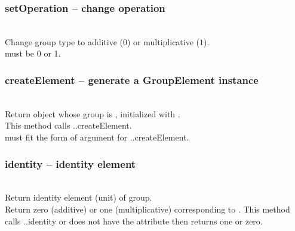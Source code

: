   \subsubsection{setOperation -- change operation}
   \\
   \spacing
   \quad Change group type to additive ($0$) or multiplicative ($1$).\\
   \spacing
   \quad {} must be 0 or 1.\\
 \subsubsection{\negok createElement -- generate a GroupElement instance}
   \\
   \spacing
   \quad Return  object whose group is , initialized with .\\
   \spacing
   \quad \negok This method calls ..createElement.\\
   \spacing
   \quad {} must fit the form of argument for ..createElement.\\
  \subsubsection{\negok identity -- identity element}
   \\
   \spacing
   \quad Return identity element (unit) of group.\\
   \spacing
   \quad Return zero (additive) or one (multiplicative) corresponding to .
   \negok This method calls ..identity or  does not have the attribute then returns one or zero.
   \spacing
